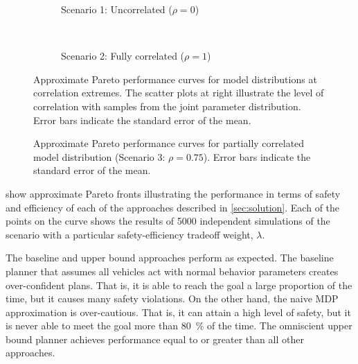 \begin{figure}[p]
    \centering
    \begin{subfigure}{\textwidth}
        \centering
        
        \vspace{-1em}
        \caption{Scenario 1: Uncorrelated ($\rho=0$)} \label{fig:000}
    \end{subfigure}\\
    \begin{subfigure}{\textwidth}
        \centering
        \vspace{1cm}
        
        \vspace{-1em}
        \caption{Scenario 2: Fully correlated ($\rho=1$)} \label{fig:100}
        \vspace{1em}
    \end{subfigure}
    \caption[Performance curves at correlation extremes]{Approximate Pareto performance curves for model distributions at correlation extremes. The scatter plots at right illustrate the level of correlation with samples from the joint parameter distribution. Error bars indicate the standard error of the mean.}
    \label{fig:gaps}
\end{figure}

\begin{figure}[htbp]
    \centering
    
    \caption[Performance curves at correlation \num{0.75}]{Approximate Pareto performance curves for partially correlated model distribution (Scenario 3: $\rho=0.75$). Error bars indicate the standard error of the mean.}
    \label{fig:075}
\end{figure}


 show approximate Pareto fronts illustrating the performance in terms of safety and efficiency of each of the approaches described in \cref{sec:solution}.
Each of the points on the curve shows the results of \num{5000} independent simulations of the scenario with a particular safety-efficiency tradeoff weight, $\lambda$.

The baseline and upper bound approaches perform as expected.
The baseline planner that assumes all vehicles act with normal behavior parameters creates over-confident plans.
That is, it is able to reach the goal a large proportion of the time, but it causes many safety violations.
On the other hand, the naive MDP approximation is over-cautious. 
That is, it can attain a high level of safety, but it is never able to meet the goal more than \SI{80}{\percent} of the time.
The omniscient upper bound planner achieves performance equal to or greater than all other approaches.

